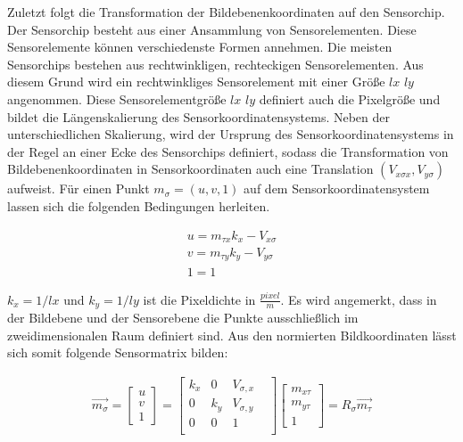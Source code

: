 Zuletzt folgt die Transformation der Bildebenenkoordinaten auf den Sensorchip. Der Sensorchip besteht aus einer Ansammlung von Sensorelementen. Diese Sensorelemente können verschiedenste Formen annehmen. Die meisten Sensorchips bestehen aus rechtwinkligen, rechteckigen Sensorelementen. Aus diesem Grund wird ein rechtwinkliges Sensorelement mit einer Größe $lx$ $ly$ angenommen. Diese Sensorelementgröße $lx$ $ly$ definiert auch die Pixelgröße und bildet die Längenskalierung des Sensorkoordinatensystems. Neben der unterschiedlichen Skalierung, wird der Ursprung des Sensorkoordinatensystems in der Regel an einer Ecke des Sensorchips definiert, sodass die Transformation von Bildebenenkoordinaten in Sensorkoordinaten auch eine Translation $(V_{x\sigma x},V_{y\sigma})$ aufweist\cite{HZ,Photonik}. Für einen Punkt $m_\sigma = ({u},{v},1)$ auf dem Sensorkoordinatensystem lassen sich die folgenden Bedingungen herleiten. %

\begin{gather}	
	{u}=m_{\tau x} k_x - V_{x\sigma}\\
	{v}=m_{\tau y} k_y - V_{y\sigma}\\
	1=1
\end{gather}

$k_x=1/lx$ und $k_y=1/ly$ ist die Pixeldichte in $\frac{pixel}{m}$.
Es wird angemerkt, dass in der Bildebene und der Sensorebene die Punkte ausschließlich im zweidimensionalen Raum definiert sind. Aus den normierten Bildkoordinaten lässt sich somit folgende Sensormatrix bilden:

\begin{gather}
	\vec{m_\sigma}=\begin{bmatrix}u \\v\\1 \end{bmatrix}=
	\begin{bmatrix}
		k_x&0&V_{\sigma,x}\\
		0&k_y&V_{\sigma,y}\\
		0&0&1&\\
	\end{bmatrix}
	\begin{bmatrix}m_{x \tau}\\ m_{y \tau}\\ 1\end{bmatrix}= R_\sigma \vec{m_\tau}
\end{gather}

